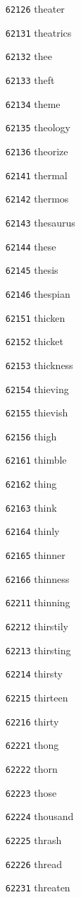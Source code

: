 \documentclass[twoside,11pt]{article}
\begin{document}
\begin{multicols}{5}
\begin{enumerate}
\item[\texttt{62126}] theater
\item[\texttt{62131}] theatrics
\item[\texttt{62132}] thee
\item[\texttt{62133}] theft
\item[\texttt{62134}] theme
\item[\texttt{62135}] theology
\item[\texttt{62136}] theorize
\item[\texttt{62141}] thermal
\item[\texttt{62142}] thermos
\item[\texttt{62143}] thesaurus
\item[\texttt{62144}] these
\item[\texttt{62145}] thesis
\item[\texttt{62146}] thespian
\item[\texttt{62151}] thicken
\item[\texttt{62152}] thicket
\item[\texttt{62153}] thickness
\item[\texttt{62154}] thieving
\item[\texttt{62155}] thievish
\item[\texttt{62156}] thigh
\item[\texttt{62161}] thimble
\item[\texttt{62162}] thing
\item[\texttt{62163}] think
\item[\texttt{62164}] thinly
\item[\texttt{62165}] thinner
\item[\texttt{62166}] thinness
\item[\texttt{62211}] thinning
\item[\texttt{62212}] thirstily
\item[\texttt{62213}] thirsting
\item[\texttt{62214}] thirsty
\item[\texttt{62215}] thirteen
\item[\texttt{62216}] thirty
\item[\texttt{62221}] thong
\item[\texttt{62222}] thorn
\item[\texttt{62223}] those
\item[\texttt{62224}] thousand
\item[\texttt{62225}] thrash
\item[\texttt{62226}] thread
\item[\texttt{62231}] threaten

\end{enumerate}
\end{multicols}
\end{document}
